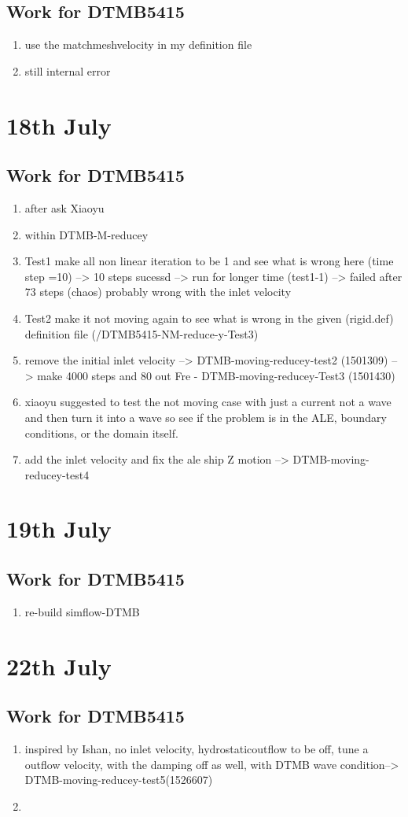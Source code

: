 \documentclass[12pt]{article} %
\begin{document}
\subsection{Work for DTMB5415}
\begin{enumerate}
    \item use the matchmeshvelocity in my definition file       
    \item still internal error  
\end{enumerate}
\section{18th July}
\subsection{Work for DTMB5415}
\begin{enumerate}
    \item after ask Xiaoyu
    \item within DTMB-M-reducey
    \item Test1 make all non linear iteration to be 1 and see what is wrong here (time step =10) --> 10 steps sucessd --> run for longer time (test1-1) --> failed after 73 steps (chaos)
    probably wrong with the inlet velocity
    \item Test2 make it not moving again to see what is wrong in the given (rigid.def) definition file (/DTMB5415-NM-reduce-y-Test3)
    \item remove the initial inlet velocity --> DTMB-moving-reducey-test2 (1501309) --> make 4000 steps and 80 out Fre - DTMB-moving-reducey-Test3 (1501430)
    \item xiaoyu suggested to test the not moving case with just a current not a wave and then turn it into a wave so see if the problem is in the ALE, boundary conditions, or the domain itself.
    \item add the inlet velocity and fix the ale ship Z motion --> DTMB-moving-reducey-test4
\end{enumerate}
\section{19th July}
\subsection{Work for DTMB5415}
\begin{enumerate}
    \item re-build simflow-DTMB
\end{enumerate}
\section{22th July}
\subsection{Work for DTMB5415}
\begin{enumerate}
    \item inspired by Ishan, no inlet velocity, hydrostaticoutflow to be off, tune a outflow velocity, with the damping off as well, with DTMB wave condition--> DTMB-moving-reducey-test5(1526607)
    \item 
\end{enumerate}
\end{document}
